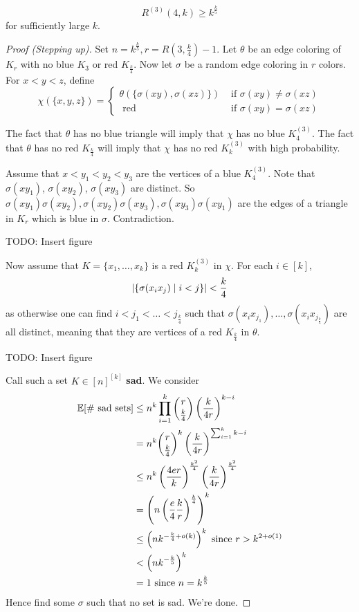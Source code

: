 \documentclass{article}
\begin{document}
\begin{nthm}
  $$R^{(3)}(4, k) \ge k^{\frac k5}$$
  for sufficiently large $k$.
\end{nthm}
\begin{proof}[Proof (Stepping up)]
  Set $n = k^{\frac k5}, r = R(3, \frac k4) - 1$. Let $\theta$ be an edge coloring of $K_r$ with no blue $K_3$ or red $K_{\frac k4}$. Now let $\sigma$ be a random edge coloring in $r$ colors. For $x < y < z$, define
  $$\chi(\{x, y, z\}) =
  \begin{cases}
    \theta(\{\sigma(xy), \sigma(xz)\}) & \text{ if } \sigma(xy) \ne \sigma(xz) \\
    \text{ red} & \text{ if } \sigma(xy) = \sigma(xz)
  \end{cases}$$
  \begin{idea}
    The fact that $\theta$ has no blue triangle will imply that $\chi$ has no blue $K_4^{(3)}$. The fact that $\theta$ has no red $K_{\frac k4}$ will imply that $\chi$ has no red $K_k^{(3)}$ with high probability.
  \end{idea}
  Assume that $x < y_1 < y_2 < y_3$ are the vertices of a blue $K_4^{(3)}$. Note that $\sigma(xy_1)$, $\sigma(xy_2)$, $\sigma(xy_3)$ are distinct. So $\sigma(xy_1)\sigma(xy_2), \sigma(xy_2)\sigma(xy_3), \sigma(xy_3)\sigma(xy_1)$ are the edges of a triangle in $K_r$ which is blue in $\sigma$. Contradiction.
  
  TODO: Insert figure

  Now assume that $K = \{x_1, \dots, x_k\}$ is a red $K_k^{(3)}$ in $\chi$. For each $i \in [k]$,
  $$\left\lvert \{\sigma(x_ix_j) \mid i < j\}\right\rvert < \frac k4$$
  as otherwise one can find $i < j_1 < \dots < j_{\frac k4}$ such that $\sigma(x_ix_{j_1}), \dots, \sigma(x_ix_{j_{\frac k4}})$ are all distinct, meaning that they are vertices of a red $K_{\frac k4}$ in $\theta$.
  
  TODO: Insert figure

  Call such a set $K \in [n]^{[k]}$ {\bf sad}. We consider
  \begin{align*}
    \mathbb E[\#\text{ sad sets}]
    & \le n^k \prod_{i = 1}^k \binom r{\frac k4} \left(\frac k{4r}\right)^{k - i} \\
    & = n^k \binom r{\frac k4}^k \left(\frac k{4r}\right)^{\sum_{i = 1}^k k - i} \\
    & \le n^k \left(\frac{4er}k\right)^{\frac{k^2}4} \left(\frac k{4r}\right)^{\frac{k^2}4} \\
    & = \left(n\left(\frac e4 \frac kr\right)^{\frac k4}\right)^k \\
    & \le \left(nk^{-\frac k4 + o(k)}\right)^k \text{ since } r > k^{2 + o(1)} \\
    & < \left(nk^{-\frac k5}\right)^k \\
    & = 1 \text{ since } n = k^{\frac k5}
  \end{align*}
  Hence find some $\sigma$ such that no set is sad. We're done.
\end{proof}

\newlec

\printindex
\end{document}
